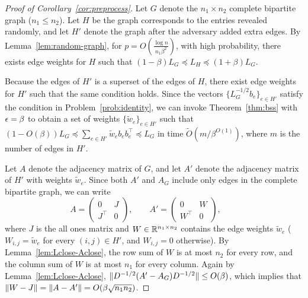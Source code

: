 \begin{proof}[Proof of Corollary~\ref{cor:preprocess}]
Let $G$ denote the $n_1 \times n_2$ complete bipartite graph ($n_1 \le n_2$).
Let $H$ be the graph corresponds to the entries revealed randomly, and let $H'$ denote the graph after the adversary added extra edges.
By Lemma~\ref{lem:random-graph}, for $p = O\left(\frac{\log n}{n_1 \beta^2}\right)$, with high probability, there exists edge weights for $H$ such that $(1-\beta) L_G \preceq L_H \preceq (1+\beta) L_G$.

Because the edges of $H'$ is a superset of the edges of $H$, there exist edge weights for $H'$ such that the same condition holds.
Since the vectors $\{L_G^{-1/2} b_e\}_{e \in H'}$ satisfy the condition in Problem~\ref{prob:identity}, we can invoke Theorem~\ref{thm:bss} with $\epsilon = \beta$ to obtain a set of weights $\{\tilde w_e\}_{e \in H'}$ such that $(1-O(\beta))L_G \preceq \sum_{e \in H'} \tilde w_e b_e b_e^\top \preceq L_G$ in time $\tilde O(m / \beta^{O(1)})$, where $m$ is the number of edges in $H'$.

Let $A$ denote the adjacency matrix of $G$, and let $A'$ denote the adjacency matrix of $H'$ with weights $\tilde w_e$.
Since both $A'$ and $A_G$ include only edges in the complete bipartite graph, we can write
\[
A = \left(\begin{array}{cc} 0 & J \\ J^\top & 0 \end{array}\right), \qquad
A' = \left(\begin{array}{cc} 0 & W \\ W^\top & 0 \end{array}\right), \qquad
\]
where $J$ is the all ones matrix and $W \in \mathbb{R}^{n_1 \times n_2}$ contains the edge weights $\tilde w_e$ ($W_{i,j} = \tilde w_e$ for every $(i,j) \in H'$, and $W_{i,j} = 0$ otherwise).
By Lemma~\ref{lem:Lclose-Aclose}, the row sum of $W$ is at most $n_2$ for every row, and the column sum of $W$ is at most $n_1$ for every column.
Again by Lemma~\ref{lem:Lclose-Aclose}, $\lVert D^{-1/2} (A' - A_{G}) D^{-1/2}{\rVert} \le O(\beta)$, which implies that $\lVert W - J{\rVert} = \lVert A - A'{\rVert} = O(\beta \sqrt{n_1 n_2})$.
\end{proof}